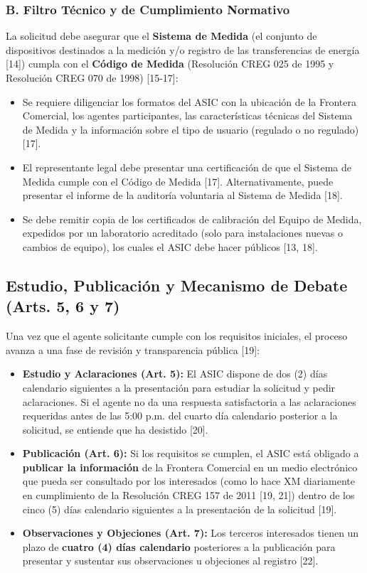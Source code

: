 \documentclass[a5paper]{book}%
\begin{document}
\subsubsection*{B. Filtro Técnico y de Cumplimiento Normativo}
La solicitud debe asegurar que el \textbf{Sistema de Medida} (el conjunto de dispositivos destinados a la medición y/o registro de las transferencias de energía [14]) cumpla con el \textbf{Código de Medida} (Resolución CREG 025 de 1995 y Resolución CREG 070 de 1998) [15-17]:
\begin{itemize}
	\item Se requiere diligenciar los formatos del ASIC con la ubicación de la Frontera Comercial, los agentes participantes, las características técnicas del Sistema de Medida y la información sobre el tipo de usuario (regulado o no regulado) [17].
	\item El representante legal debe presentar una certificación de que el Sistema de Medida cumple con el Código de Medida [17]. Alternativamente, puede presentar el informe de la auditoría voluntaria al Sistema de Medida [18].
	\item Se debe remitir copia de los certificados de calibración del Equipo de Medida, expedidos por un laboratorio acreditado (solo para instalaciones nuevas o cambios de equipo), los cuales el ASIC debe hacer públicos [13, 18].
\end{itemize}

\subsection{Estudio, Publicación y Mecanismo de Debate (Arts. 5\textdegree, 6\textdegree{} y 7\textdegree)}

Una vez que el agente solicitante cumple con los requisitos iniciales, el proceso avanza a una fase de revisión y transparencia pública [19]:

\begin{itemize}
	\item \textbf{Estudio y Aclaraciones (Art. 5\textdegree):} El ASIC dispone de dos (2) días calendario siguientes a la presentación para estudiar la solicitud y pedir aclaraciones. Si el agente no da una respuesta satisfactoria a las aclaraciones requeridas antes de las 5:00 p.m. del cuarto día calendario posterior a la solicitud, se entiende que ha desistido [20].
	\item \textbf{Publicación (Art. 6\textdegree):} Si los requisitos se cumplen, el ASIC está obligado a \textbf{publicar la información} de la Frontera Comercial en un medio electrónico que pueda ser consultado por los interesados (como lo hace XM diariamente en cumplimiento de la Resolución CREG 157 de 2011 [19, 21]) dentro de los cinco (5) días calendario siguientes a la presentación de la solicitud [19].
	\item \textbf{Observaciones y Objeciones (Art. 7\textdegree):} Los terceros interesados tienen un plazo de \textbf{cuatro (4) días calendario} posteriores a la publicación para presentar y sustentar sus observaciones u objeciones al registro [22].
\end{itemize}
\end{document}
